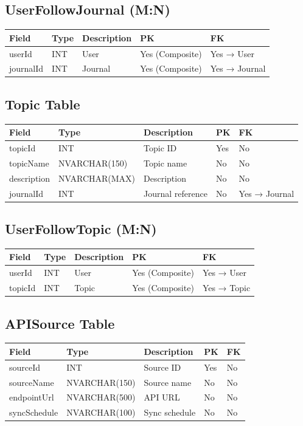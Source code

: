 \documentclass[12pt,a4paper]{article}
\begin{document}
{{%
\subsection{UserFollowJournal (M:N)}
\begin{longtable}{|p{3cm}|p{3cm}|p{6cm}|p{1.5cm}|p{1.5cm}|}
	\hline
	Field & Type & Description & PK & FK \\
	\hline
	userId & INT & User & Yes (Composite) & Yes → User \\
	journalId & INT & Journal & Yes (Composite) & Yes → Journal \\
	\hline
\end{longtable}

\subsection{Topic Table}
\begin{longtable}{|p{3cm}|p{3cm}|p{6cm}|p{1.5cm}|p{1.5cm}|}
	\hline
	Field & Type & Description & PK & FK \\
	\hline
	topicId & INT & Topic ID & Yes & No \\
	topicName & NVARCHAR(150) & Topic name & No & No \\
	description & NVARCHAR(MAX) & Description & No & No \\
	journalId & INT & Journal reference & No & Yes → Journal \\
	\hline
\end{longtable}

\subsection{UserFollowTopic (M:N)}
\begin{longtable}{|p{3cm}|p{3cm}|p{6cm}|p{1.5cm}|p{1.5cm}|}
	\hline
	Field & Type & Description & PK & FK \\
	\hline
	userId & INT & User & Yes (Composite) & Yes → User \\
	topicId & INT & Topic & Yes (Composite) & Yes → Topic \\
	\hline
\end{longtable}

\subsection{APISource Table}
\begin{longtable}{|p{3cm}|p{3cm}|p{6cm}|p{1.5cm}|p{1.5cm}|}
	\hline
	Field & Type & Description & PK & FK \\
	\hline
	sourceId & INT & Source ID & Yes & No \\
	sourceName & NVARCHAR(150) & Source name & No & No \\
	endpointUrl & NVARCHAR(500) & API URL & No & No \\
	syncSchedule & NVARCHAR(100) & Sync schedule & No & No \\
	\hline
\end{longtable}

}}
\end{document}
